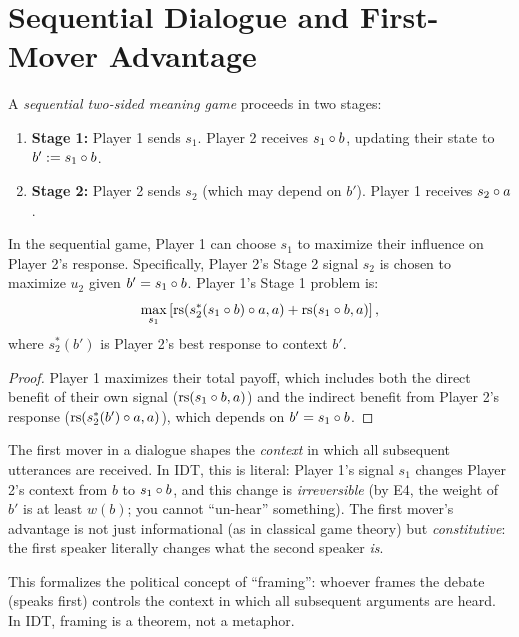 \section{Sequential Dialogue and First-Mover Advantage}

\begin{definition}
\label{def:sequential-game}
A \emph{sequential two-sided meaning game} proceeds in two stages:
\begin{enumerate}
\item \textbf{Stage 1:} Player 1 sends $s_1$. Player 2 receives
$s_1 \circ b$, updating their state to $b' := s_1 \circ b$.
\item \textbf{Stage 2:} Player 2 sends $s_2$ (which may depend on $b'$).
Player 1 receives $s_2 \circ a$.
\end{enumerate}
\end{definition}

\begin{theorem}
\label{thm:first-mover}
In the sequential game, Player 1 can choose $s_1$ to maximize their influence
on Player 2's response. Specifically, Player 2's Stage 2 signal $s_2$ is
chosen to maximize $u_2$ given $b' = s_1 \circ b$. Player 1's Stage 1
problem is:
\[
\max_{s_1} \left[ \mathrm{rs}(s_2^*(s_1 \circ b) \circ a, a) + \mathrm{rs}(s_1 \circ b, a) \right],
\]
where $s_2^*(b')$ is Player 2's best response to context $b'$.
\end{theorem}

\begin{proof}
Player 1 maximizes their total payoff, which includes both the direct
benefit of their own signal ($\mathrm{rs}(s_1 \circ b, a)$) and the indirect
benefit from Player 2's response ($\mathrm{rs}(s_2^*(b') \circ a, a)$), which
depends on $b' = s_1 \circ b$.
\end{proof}

\begin{interpretation}
The first mover in a dialogue shapes the \emph{context} in which all
subsequent utterances are received. In IDT, this is literal: Player 1's signal
$s_1$ changes Player 2's context from $b$ to $s_1 \circ b$, and this
change is \emph{irreversible} (by E4, the weight of $b'$ is at least $w(b)$;
you cannot ``un-hear'' something). The first mover's advantage is not just
informational (as in classical game theory) but \emph{constitutive}: the first
speaker literally changes what the second speaker \emph{is}.

This formalizes the political concept of ``framing'': whoever frames the
debate (speaks first) controls the context in which all subsequent arguments
are heard. In IDT, framing is a theorem, not a metaphor.
\end{interpretation}

